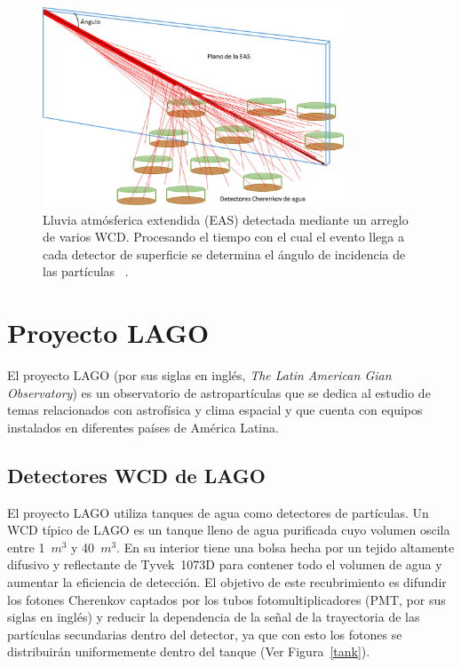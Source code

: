 \begin{figure}[H]
\centering
\includegraphics[width=0.8\textwidth]{Figs/imagenllu.jpeg} 
\caption[Lluvia atmósferica extendida (EAS)]
{Lluvia atmósferica extendida (EAS) detectada mediante un arreglo de varios WCD.
Procesando el tiempo con el cual el evento llega a cada detector de superficie se determina el ángulo de incidencia de las partículas ~\citep{hernandez2018procedimiento}.}
\label{lluvia}
\end{figure}

\section{Proyecto LAGO}
El proyecto LAGO (por sus siglas en inglés, \textit{The Latin American Gian Observatory}) es un observatorio de astropartículas que se dedica al estudio de temas relacionados con astrofísica y clima espacial y que cuenta con equipos instalados en diferentes países de América Latina.

\subsection{Detectores WCD de LAGO}
El proyecto LAGO utiliza tanques de agua como detectores de partículas.
Un WCD típico de LAGO es un tanque lleno de agua purificada cuyo volumen oscila entre 1~$m^3$ y 40~$m^3$.
En su interior tiene una bolsa hecha por un tejido altamente difusivo y reflectante de Tyvek~\textregistered1073D para contener todo el volumen de agua y aumentar la eficiencia de detección.
El objetivo de este recubrimiento es difundir los fotones Cherenkov captados por los tubos fotomultiplicadores (PMT, por sus siglas en inglés) y reducir la dependencia de la señal de la trayectoria de las partículas secundarias dentro del detector, ya que con esto los fotones se distribuirán uniformemente dentro del tanque (Ver Figura~\ref{tank}).

